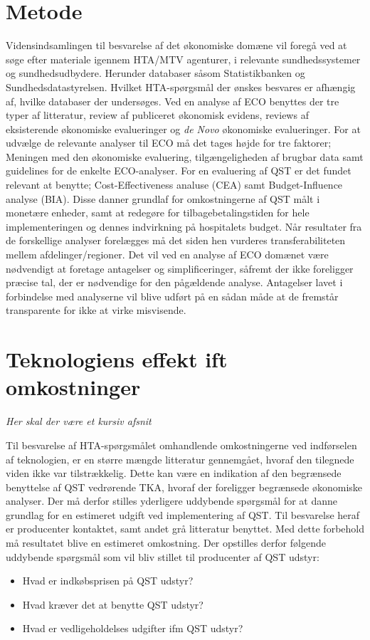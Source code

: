 \section{Metode}
Vidensindsamlingen til besvarelse af det økonomiske domæne vil foregå ved at søge efter materiale igennem HTA/MTV agenturer, i relevante sundhedssystemer og sundhedsudbydere. Herunder databaser såsom Statistikbanken og Sundhedsdatastyrelsen. Hvilket HTA-spørgsmål der ønskes besvares er afhængig af, hvilke databaser der undersøges. Ved en analyse af ECO benyttes der tre typer af litteratur, review af publiceret økonomisk evidens, reviews af eksisterende økonomiske evalueringer og \textit{de Novo} økonomiske evalueringer. For at udvælge de relevante analyser til ECO må det tages højde for tre faktorer; Meningen med den økonomiske evaluering, tilgængeligheden af brugbar data samt guidelines for de enkelte ECO-analyser. For en evaluering af QST er det fundet relevant at benytte; Cost-Effectiveness analuse (CEA) samt Budget-Influence analyse (BIA). Disse danner grundlaf for omkostningerne af QST målt i monetære enheder, samt at redegøre for tilbagebetalingstiden for hele implementeringen og dennes indvirkning på hospitalets budget. Når resultater fra de forskellige analyser forelægges må det siden hen vurderes transferabiliteten mellem afdelinger/regioner. Det vil ved en analyse af ECO domænet være nødvendigt at foretage antagelser og simplificeringer, såfremt der ikke foreligger præcise tal, der er nødvendige for den pågældende analyse. Antagelser lavet i forbindelse med analyserne vil blive udført på en sådan måde at de fremstår transparente for ikke at virke misvisende. 

\section{Teknologiens effekt ift omkostninger}
\textit{Her skal der være et kursiv afsnit} 

Til besvarelse af HTA-spørgsmålet omhandlende omkostningerne ved indførselen af teknologien, er en større mængde litteratur gennemgået, hvoraf den tilegnede viden ikke var tilstrækkelig. Dette kan være en indikation af den begrænsede benyttelse af QST vedrørende TKA, hvoraf der foreligger begrænsede økonomiske analyser. Der må derfor stilles yderligere uddybende spørgsmål for at danne grundlag for en estimeret udgift ved implementering af QST. Til besvarelse heraf er producenter kontaktet, samt andet grå litteratur benyttet. Med dette forbehold må resultatet blive en estimeret omkostning. 
Der opstilles derfor følgende uddybende spørgsmål som vil bliv stillet til producenter af QST udstyr:
\begin{itemize}  
\item Hvad er indkøbsprisen på QST udstyr? 
\item Hvad kræver det at benytte QST udstyr? 
\item Hvad er vedligeholdelses udgifter ifm QST udstyr?
\end{itemize}

